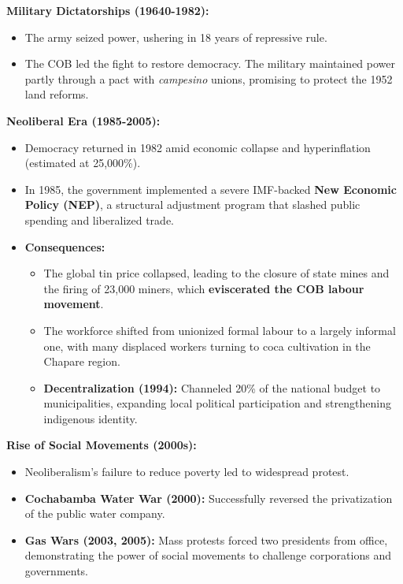 \documentclass{article}
\begin{document}
    \noindent \textbf{Military Dictatorships (19640-1982):}
    \begin{itemize}
        \item The army seized power, ushering in 18 years of repressive rule.
        \item The COB led the fight to restore democracy. The military
        maintained power partly through a pact with \textit{campesino}
        unions, promising to protect the 1952 land reforms.
    \end{itemize}

    \noindent \textbf{Neoliberal Era (1985-2005):}
    \begin{itemize}
        \item Democracy returned in 1982 amid economic collapse and
        hyperinflation (estimated at 25,000\%).
        \item In 1985, the government implemented a severe IMF-backed \textbf{New Economic Policy (NEP)}, a structural adjustment program that slashed public spending and liberalized trade.
        \item \textbf{Consequences:}
        \begin{itemize}
            \item The global tin price collapsed, leading to the closure of
            state mines and the firing of 23,000 miners, which
            \textbf{eviscerated the COB labour movement}.
            \item The workforce shifted from unionized formal labour to a
            largely informal one, with many displaced workers turning to
            coca cultivation in the Chapare region.
            \item \textbf{Decentralization (1994):} Channeled 20\% of the
            national budget to municipalities, expanding local political
            participation and strengthening indigenous identity.
        \end{itemize}
    \end{itemize}

    \noindent \textbf{Rise of Social Movements (2000s):}
    \begin{itemize}
        \item Neoliberalism's failure to reduce poverty led to widespread
        protest.
        \item \textbf{Cochabamba Water War (2000):} Successfully reversed the
        privatization of the public water company.
        \item \textbf{Gas Wars (2003, 2005):} Mass protests forced two
        presidents from office, demonstrating the power of social movements
        to challenge corporations and governments.
    \end{itemize}
\end{document}
